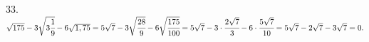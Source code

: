 33. $\sqrt{175}-3\sqrt{3\cfrac{1}{9}}-6\sqrt{1,75}=5\sqrt{7}-3\sqrt{\cfrac{28}{9}}-6\sqrt{\cfrac{175}{100}}=
5\sqrt{7}-3\cdot\cfrac{2\sqrt{7}}{3}-6\cdot\cfrac{5\sqrt{7}}{10}=5\sqrt{7}-2\sqrt{7}-3\sqrt{7}=0.$\\
